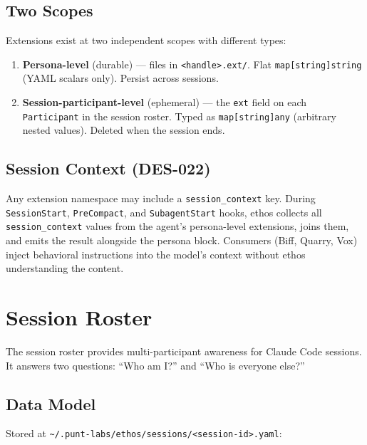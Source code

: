 \documentclass[a4paper,10pt]{article}
\newcommand{\field}[1]{\texttt{#1}}
\newcommand{\fpath}[1]{\texttt{#1}}
\begin{document}
\subsection{Two Scopes}

Extensions exist at two independent scopes with different types:

\begin{enumerate}
  \item \textbf{Persona-level} (durable) --- files in
    \fpath{<handle>.ext/}.  Flat \texttt{map[string]string} (YAML
    scalars only).  Persist across sessions.
  \item \textbf{Session-participant-level} (ephemeral) --- the
    \field{ext} field on each \texttt{Participant} in the session
    roster.  Typed as \texttt{map[string]any} (arbitrary nested
    values).  Deleted when the session ends.
\end{enumerate}

\subsection{Session Context (DES-022)}

Any extension namespace may include a \texttt{session\_context} key.
During \texttt{SessionStart}, \texttt{PreCompact}, and
\texttt{SubagentStart} hooks, ethos collects all
\texttt{session\_context} values from the agent's persona-level
extensions, joins them, and emits the result alongside the persona
block.  Consumers (Biff, Quarry, Vox) inject behavioral instructions
into the model's context without ethos understanding the content.

\section{Session Roster}

The session roster provides multi-participant awareness for Claude
Code sessions.  It answers two questions: ``Who am I?'' and ``Who is
everyone else?''

\subsection{Data Model}

Stored at \fpath{\~{}/.punt-labs/ethos/sessions/<session-id>.yaml}:
\end{document}
